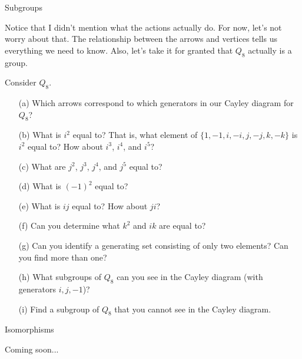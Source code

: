 \begin{section}{Subgroups}
\begin{center}
\end{center}

Notice that I didn't mention what the actions actually do.  For now, let's not worry about that.  The relationship between the arrows and vertices tells us everything we need to know.  Also, let's take it for granted that $Q_8$ actually is a group.

\begin{exercise}
Consider $Q_8$.
\begin{enumerate}
\item[(a)] Which arrows correspond to which generators in our Cayley diagram for $Q_8$?
\item[(b)] What is $i^2$ equal to?  That is, what element of $\{1,-1,i,-i,j,-j,k,-k\}$ is $i^2$ equal to?  How about $i^3$, $i^4$, and $i^5$?
\item[(c)] What are $j^2$, $j^3$, $j^4$, and $j^5$ equal to?
\item[(d)] What is $(-1)^2$ equal to?
\item[(e)] What is $ij$ equal to?  How about $ji$?
\item[(f)] Can you determine what $k^2$ and $ik$ are equal to?
\item[(g)] Can you identify a generating set consisting of only two elements?  Can you find more than one?
\item[(h)] What subgroups of $Q_8$ can you see in the Cayley diagram (with generators $i, j, -1$)?
\item[(i)] Find a subgroup of $Q_8$ that you cannot see in the Cayley diagram.
\end{enumerate}
\end{exercise}

\end{section}

\begin{section}{Isomorphisms}

Coming soon...
\end{section}
